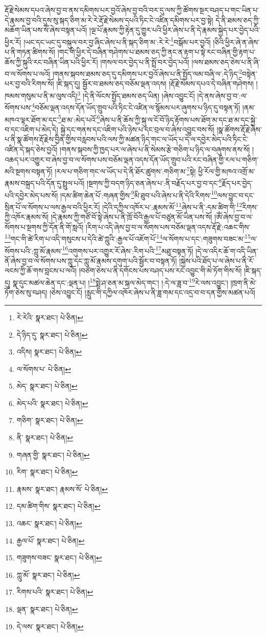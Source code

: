 རྡོ་རྗེ་སེམས་དཔའ་ཞེས་བྱ་བ་ནས་དམིགས་པར་བྱའོ་ཞེས་བྱ་བའི་བར་དུ་ལས་ཀྱི་ཚོགས་སྔར་བཤད་པ་གང་ཡིན་པ་དེ་རྣམས་བྱ་བའི་དུས་སུ་སྐད་ཅིག་མ་རེ་རེ་རྡོ་རྗེ་སེམས་དཔའི་ཏིང་ངེ་འཛིན་དམིགས་པར་བྱ་སྟེ། དེ་ནི་ཐམས་ཅད་ཀྱི་མཆོག་ཡིན་པས་སོ་ཞེས་བསྟན་པའོ། །ལྔ་པོ་རྣམས་ཀྱི་རྟེན་དུ་གྱུར་པའི་ཕྱིར་ཞེས་པ་ནི་དེ་རྣམས་སྐྱེད་པར་བྱེད་པའི་ཕྱིར་རོ། །ཡང་དང་ཡང་དུ་བསྐུལ་བར་བྱ་ཞིང་ཞེས་པ་ནི་སྐད་ཅིག་མ་:རེ་རེ་\footnote{རེ་རེའི་  སྣར་ཐང་།  པེ་ཅིན། }བསྒོམ་པར་བྱའོ། །ཅིའི་ཕྱིར་ཞེ་ན་ཞེས་པ་ནི་གཏན་ཚིགས་སོ། །གང་གི་ཕྱིར་དེ་བཞིན་གཤེགས་པ་ཐམས་ཅད་ཀྱི་ནང་ན་རྟག་པ་སྟེ་རང་བཞིན་གྱི་རྟག་པ་ཆོས་ཀྱི་སྐུའི་རང་བཞིན་ཡིན་པའི་ཕྱིར་རོ། །གསལ་བར་བྱེད་པ་ནི་སྤྲོ་བར་བྱེད་པའོ། །ལས་ཐམས་ཅད་ཅེས་པ་ནི་ཞི་བ་ལ་སོགས་པ་ལའོ། །གནས་སྐབས་ཐམས་ཅད་དུ་དམིགས་པར་བྱའོ་ཞེས་པ་ནི་སྤྱོད་ལམ་བཞི་ལ་:དེ་ཉིད་\footnote{དེ་ཉིད་དུ་  སྣར་ཐང་།  པེ་ཅིན། }བསྟེན་པར་བྱ་བའི་རིགས་སོ། །ཇི་སྐད་དུ། སྦྱོར་བ་ཐམས་ཅད་བཅོམ་ལྡན་འདས། །རྡོ་རྗེ་སེམས་དཔའ་དེ་བཞིན་གཤེགས། །ཁམས་གསུམ་པ་ནི་མ་ལུས་འདི།\footnote{འདིས།  སྣར་ཐང་།  པེ་ཅིན། } །དེ་ནི་ལོངས་སྤྱོད་ཐམས་ཅད་ཡིན། །ཞེས་འབྱུང་ངོ། །དེ་ནས་ཞེས་བྱ་བ་:ལ་སོགས་པས་\footnote{ལ་སོགས་པ་  པེ་ཅིན། }བཅོམ་ལྡན་འདས་དོན་ཡོད་གྲུབ་པའི་ཏིང་ངེ་འཛིན་ལ་སྙོམས་པར་ཞུགས་པ་ཉིད་དུ་བསྟན་ཏོ། །ནམ་མཁའ་ལྟར་ཐོག་མ་དང་\footnote{མེད་  སྣར་ཐང་།  པེ་ཅིན། }ཐ་མ་:མེད་པའོ་\footnote{མེད་པའི་  སྣར་ཐང་།  པེ་ཅིན། }ཞེས་པ་ནི་ཆོས་ཀྱི་སྐུ་ལ་ངོ་བོ་ཉིད་རྟོགས་པས་ཐོག་མ་དང་ཐ་མ་དང་སྐྱེ་བ་དང་འཇིག་པ་མེད་དེ། སྐྱེ་དང་གནས་དང་འཇིག་པའི་ཉེས་པ་དང་བྲལ་བ་ཞེས་འབྱུང་བས་སོ། །སྣ་ཚོགས་རྡོ་རྗེ་ཞེས་པ་ནི་སྣ་ཚོགས་རྡོ་རྗེས་བྱིན་གྱིས་བརླབས་པའི་ལས་ཀྱི་མཚན་ཉིད་གང་ལ་ཡོད་པ་དེ་ལ་དབྱེར་མེད་པའི་ཏིང་ངེ་འཛིན་དེ་སྐད་ཅེས་བྱའོ། །གནས་སྐབས་ཀྱི་ཁྱད་པར་ལ་ཞེས་པ་ནི་སེམས་རྩེ་གཅིག་པ་ཉིད་ལ་བཞུགས་ནས་སོ། །འཆད་པར་འགྱུར་བ་ཞེས་བྱ་བ་ལ་སོགས་པས་བཅོམ་ལྡན་འདས་དོན་ཡོད་གྲུབ་པའི་རང་བཞིན་གྱི་རལ་པ་གཅིག་མའི་སྔགས་བསྟན་ཏོ། །རལ་པ་གཅིག་གང་ལ་ཡོད་པ་དེ་ནི་ཐོར་ཚུགས་:གཅིག་མ་\footnote{གཅིག་  སྣར་ཐང་།  པེ་ཅིན། }སྟེ། ཕྱི་རོལ་གྱི་མཁའ་འགྲོ་མ་རྣམས་བསྐྲད་པའི་དོན་དུ་སྤྲུལ་པའོ། །སྔགས་ཀྱི་བདག་ཉིད་ཅན་ཞེས་པ་:ནི་བརྗོད་པར་བྱ་བ་དང་\footnote{ནི་  སྣར་ཐང་།  པེ་ཅིན། }རྗོད་པར་བྱེད་པའི་དབྱེར་མེད་པས་སོ། །དམ་ཚིག་ཆེན་པོ་:གཞན་གྱིས་\footnote{གཞན་གྱི་  སྣར་ཐང་།  པེ་ཅིན། }མི་ཐུབ་པའི་ཞེས་པ་ནི་དེའི་རིགས་\footnote{རིག་  སྣར་ཐང་།  པེ་ཅིན། }ལས་བྱུང་བ་དང་སྲིན་པོ་ལ་སོགས་པ་ལས་རྒྱལ་བའི་ཕྱིར་རོ། །དེའི་དཀྱིལ་འཁོར་པ་:རྣམས་མོ་\footnote{རྣམས་  སྣར་ཐང་། རྣམས་སོ་  པེ་ཅིན། }ཞེས་པ་ནི་:དམ་ཚིག་གི་\footnote{དམ་ཚིག་གིས་  སྣར་ཐང་།  པེ་ཅིན། }རིགས་ཀྱི་འཁོར་རྣམས་སོ། །དེ་རྣམས་ཀྱི་གཙོ་བོ་སྟེ་ཞེས་པ་ནི་ཁྲོ་བོའི་རྒྱལ་པོ་བཙུན་མོ་ཡིན་པས་སོ། །ཨོཾ་ཞེས་བྱ་བ་ལ་སོགས་པ་སྔགས་ཀྱི་དོན་ནི་གོ་སླའོ། །རིག་པ་འདི་ཞེས་བྱ་བ་ལ་སོགས་པས་བཅོམ་ལྡན་འདས་རྡོ་རྗེ་:འཆང་གིས་\footnote{འཆང་  སྣར་ཐང་།  པེ་ཅིན། }གང་གི་ཚེ་རིག་པ་འདི་གསུངས་པ་དེའི་ཚེ་ཀླུའི་:རྒྱལ་པོ་འཇོག་པོ་\footnote{རྒྱལ་པོ་  སྣར་ཐང་།  པེ་ཅིན། }ལ་སོགས་པ་དང་:གཟུགས་བཟང་མ་\footnote{གཟུགས་བཟང་  སྣར་ཐང་།  པེ་ཅིན། }ལ་སོགས་པའི་:ཀླུ་མོ་རྣམས་\footnote{ཀླུ་མོ་  སྣར་ཐང་།  པེ་ཅིན། }འགུགས་པར་འགྱུར་རོ་ཞེས་:རིག་པའི་\footnote{རིགས་པའི་  སྣར་ཐང་།  པེ་ཅིན། }མཐུ་བསྟན་ཏོ། །དེ་ལ་འདིར་ཆོ་ག་འདི་ཡིན་ནོ་ཞེས་བྱ་བ་ལ་སོགས་པས་ཀླུ་དང་ཀླུ་མོ་རྣམས་དགུག་པའི་སྦྱོར་བ་བསྟན་ཏོ། །སྐྱེས་པའི་ཐོད་པ་ལ་ཞེས་པ་ནི་རོ་ལངས་ཀྱི་ཆོ་གས་བླངས་པ་ལའོ། །བཙག་ཅེས་པ་ནི་དགོངས་པས་བཤད་པས་རང་འབྱུང་གི་མེ་ཏོག་གིས་སོ། །ཇི་སྐད་དུ། སྣ་དུང་མཚལ་ཆེན་དང་:ལྡན་པ། །\footnote{ལྡན་  སྣར་ཐང་།  པེ་ཅིན། }སྨེ་ཤ་ཅན་མ་སྐལ་མེད་གང་། །:དེ་ལ་ཟླ་བ་\footnote{དེ་ལས་  སྣར་ཐང་།  པེ་ཅིན། }རེ་ལས་འབྱུང་། །ཁྲག་ནི་མེ་ཏོག་ཅེས་སུ་བཤད། །ཅེས་འབྱུང་ངོ། །རླུང་གི་དཀྱིལ་འཁོར་ཞེས་པ་ནི་ཟླ་གམ་དང་འདྲ་བ་བ་དན་གྱིས་མཚན་པའོ། 